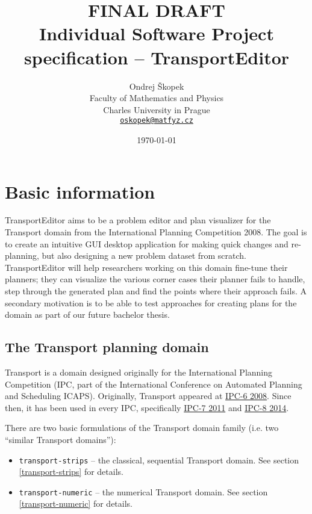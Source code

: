 \documentclass[10pt,a4paper,oneside]{article}
\author{Ondrej Škopek\\
Faculty of Mathematics and Physics\\
Charles University in Prague\\
\texttt{\href{mailto:oskopek@matfyz.cz}{oskopek@matfyz.cz}}}
\title{\textbf{FINAL DRAFT}\\Individual Software Project specification -- TransportEditor}
\date{\today}
\newcommand{\pname}{TransportEditor} %
\begin{document}
\maketitle











\section{Basic information}

\pname{} aims to be a problem editor and plan visualizer for the Transport domain from the International Planning Competition 2008.
The goal is to create an intuitive GUI desktop application for making quick changes and re-planning, but also designing a new problem dataset from scratch. \pname{} will help researchers working on this domain fine-tune their planners; they can visualize the various corner cases their planner fails to handle, step through the generated plan and find the points where their approach fails.
A secondary motivation is to be able to test approaches for creating plans for the domain as part of our future bachelor thesis.

\subsection{The Transport planning domain}

Transport is a domain designed originally for the International Planning Competition (IPC, part of the International Conference on Automated Planning and Scheduling ICAPS).
Originally, Transport appeared at \href{http://icaps-conference.org/ipc2008/deterministic/Domains.html}{IPC-6 2008}.
Since then, it has been used in every IPC, specifically \href{http://www.plg.inf.uc3m.es/ipc2011-deterministic/}{IPC-7 2011}
and \href{https://helios.hud.ac.uk/scommv/IPC-14/}{IPC-8 2014}.

There are two basic formulations of the Transport domain family (i.e. two ``similar Transport domains''):
\begin{itemize}
\item \verb+transport-strips+ -- the classical, sequential Transport domain. See section \ref{transport-strips} for details.
\item \verb+transport-numeric+ -- the numerical Transport domain. See section \ref{transport-numeric} for details.
\end{itemize}
\end{document}

